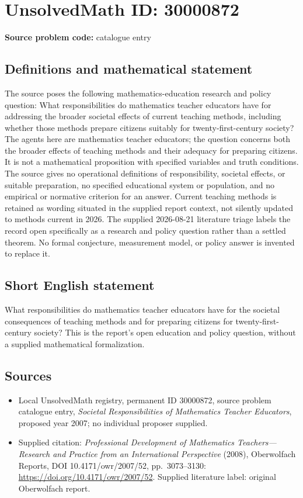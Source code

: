 \documentclass[11pt]{article}
\begin{document}
\section*{UnsolvedMath ID: 30000872}
\textbf{Source problem code:} catalogue entry
\subsection{Definitions and mathematical statement}
The source poses the following mathematics-education research and policy question: What responsibilities do mathematics teacher educators have for addressing the broader societal effects of current teaching methods, including whether those methods prepare citizens suitably for twenty-first-century society? The agents here are mathematics teacher educators; the question concerns both the broader effects of teaching methods and their adequacy for preparing citizens. It is not a mathematical proposition with specified variables and truth conditions. The source gives no operational definitions of responsibility, societal effects, or suitable preparation, no specified educational system or population, and no empirical or normative criterion for an answer. Current teaching methods is retained as wording situated in the supplied report context, not silently updated to methods current in 2026. The supplied 2026-08-21 literature triage labels the record open specifically as a research and policy question rather than a settled theorem. No formal conjecture, measurement model, or policy answer is invented to replace it.
\subsection{Short English statement}
What responsibilities do mathematics teacher educators have for the societal consequences of teaching methods and for preparing citizens for twenty-first-century society? This is the report's open education and policy question, without a supplied mathematical formalization.
\subsection{Sources}
\begin{itemize}\item Local UnsolvedMath registry, permanent ID 30000872, source problem catalogue entry, \emph{Societal Responsibilities of Mathematics Teacher Educators}, proposed year 2007; no individual proposer supplied.\item Supplied citation: \emph{Professional Development of Mathematics Teachers---Research and Practice from an International Perspective} (2008), Oberwolfach Reports, DOI 10.4171/owr/2007/52, pp.\ 3073--3130: \url{https://doi.org/10.4171/owr/2007/52}. Supplied literature label: original Oberwolfach report.\end{itemize}
\end{document}
